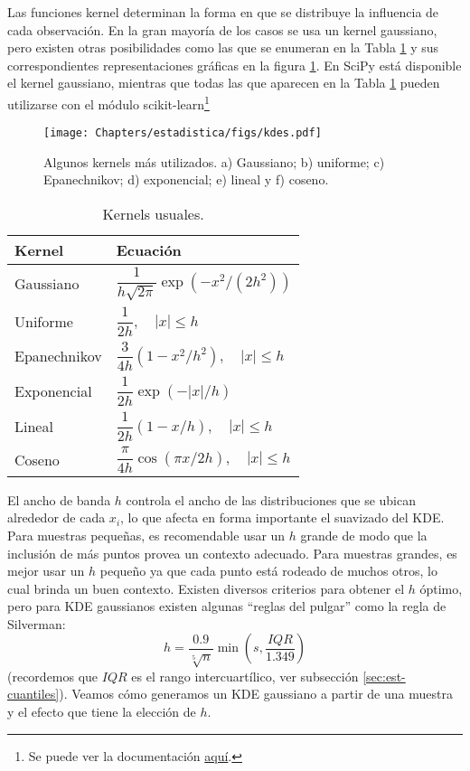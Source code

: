Las funciones kernel determinan la forma en que se distribuye la influencia de cada observación. En la gran mayoría de los casos se usa un kernel gaussiano, pero existen otras posibilidades como las que se enumeran en la Tabla \ref{tbl:estad02} y sus correspondientes representaciones gráficas en la figura \ref{fig:estad03}. En SciPy está disponible el kernel gaussiano, mientras que todas las que aparecen en la Tabla \ref{tbl:estad02} pueden utilizarse con el módulo scikit-learn\footnote{Se puede ver la documentación \href{https://scikit-learn.org/stable/modules/density.html}{aquí}.}

\begin{figure}[t]
 \centering
 \texttt{[image: Chapters/estadistica/figs/kdes.pdf]}
 \caption{Algunos kernels más utilizados. a) Gaussiano; b) uniforme; c) Epanechnikov; d) exponencial; e) lineal y f) coseno.}
 \label{fig:estad03}
\end{figure}


\begin{table}[th] \small
\centering
 \caption{Kernels usuales.}
 \label{tbl:estad02}
 \begin{tabular}{p{}  p{}}
  \toprule
  \textbf{Kernel} & \textbf{Ecuación} \\
  \midrule
  Gaussiano & $\dfrac{1}{h \sqrt{2 \pi}} \exp(-x^2 / (2 h^2))$ \\[1em]
  Uniforme & $\dfrac{1}{2h}, \quad |x| \leq h$ \\[1em]
  Epanechnikov & $\dfrac{3}{4h}(1-x^2/h^2), \quad |x| \leq h$ \\[1em]
  Exponencial & $\dfrac{1}{2h} \exp(-|x|/h)$ \\[1em]
  Lineal & $\dfrac{1}{2h} (1-x/h), \quad |x| \leq h$ \\[1em]
  Coseno & $\dfrac{\pi}{4h} \cos(\pi x / 2h), \quad |x| \leq h$ \\
  \bottomrule
\end{tabular}
\end{table}

El ancho de banda $h$ controla el ancho de las distribuciones que se ubican alrededor de cada $x_i$, lo que afecta en forma importante el suavizado del KDE. Para muestras pequeñas, es recomendable usar un $h$ grande de modo que la inclusión de más puntos provea un contexto adecuado. Para muestras grandes, es mejor usar un $h$ pequeño ya que cada punto está rodeado de muchos otros, lo cual brinda un buen contexto. Existen diversos criterios para obtener el $h$ óptimo, pero para KDE gaussianos existen algunas ``reglas del pulgar'' como la regla de Silverman:
\[ h = \frac{0.9}{\sqrt[5]{n}} \min \left( s, \frac{IQR}{1.349} \right) \]
(recordemos que $IQR$ es el rango intercuartílico, ver subsección \ref{sec:est-cuantiles}). Veamos cómo generamos un KDE gaussiano a partir de una muestra y el efecto que tiene la elección de $h$.

